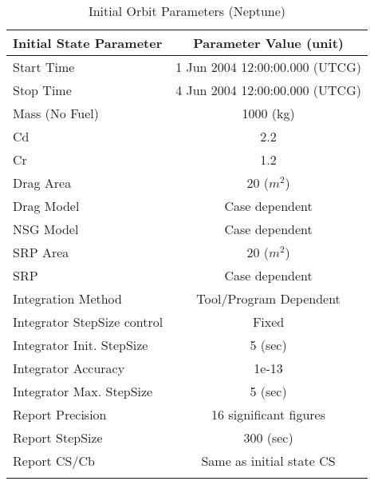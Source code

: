\begin{table}[htbp!]
\centering \caption{Initial Orbit Parameters (Neptune)}
      \begin{tabular}{lc}
      \hline\hline
            Initial State Parameter & Parameter Value (unit)\\
            \hline
            Start Time & 1 Jun 2004 12:00:00.000 (UTCG)\\
            Stop Time & 4 Jun 2004 12:00:00.000 (UTCG)\\
            
            Mass (No Fuel) & 1000 (kg)\\
            Cd & 2.2\\
            Cr & 1.2\\
            Drag Area & 20 ($m^2$)\\
            Drag Model & Case dependent\\
            NSG Model & Case dependent\\
            SRP Area & 20 ($m^2$)\\
            SRP & Case dependent\\
            Integration Method & Tool/Program Dependent\\
            Integrator StepSize control & Fixed\\
            Integrator Init. StepSize & 5 (sec)\\
            Integrator Accuracy & 1e-13\\
            Integrator Max. StepSize & 5 (sec)\\
            Report Precision & 16 significant figures\\
            Report StepSize & 300 (sec)\\
            Report CS/Cb & Same as initial state CS\\
      \hline\hline
      \label{Table: InitStateNeptune}
\end{tabular}
\end{table}

